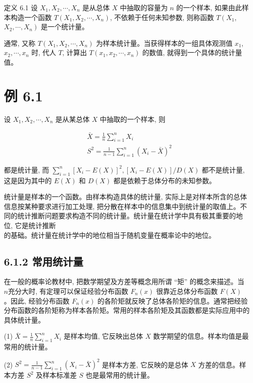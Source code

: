 \documentclass[10pt]{article}
\begin{document}
\begin{CJK*}{UTF8}{bsmi}
定义 6.1 设 $X_{1}, X_{2}, \cdots, X_{n}$ 是从总体 $X$ 中抽取的容量为 $n$ 的一个样本, 如果由此样本构造一个函数 $T\left(X_{1}, X_{2}, \cdots, X_{n}\right)$, 不依赖于任何未知参数, 则称函数 $T\left(X_{1}\right.$, $\left.X_{2}, \cdots, X_{n}\right)$ 是一个统计量。

通常, 又称 $T\left(X_{1}, X_{2}, \cdots, X_{n}\right)$ 为样本统计量。当获得样本的一组具体观测值 $x_{1}$, $x_{2}, \cdots, x_{n}$ 时, 代人 $T$, 计算出 $T\left(x_{1}, x_{2}, \cdots, x_{n}\right)$ 的数值, 就得到一个具体的统计量值。

\section*{例 6.1}
设 $X_{1}, X_{2}, \cdots, X_{n}$ 是从某总体 $X$ 中抽取的一个样本, 则

$$
\begin{aligned}
& \bar{X}=\frac{1}{n} \sum_{i=1}^{n} X_{i} \\
& S^{2}=\frac{1}{n-1} \sum_{i=1}^{n}\left(X_{i}-\bar{X}\right)^{2}
\end{aligned}
$$

都是统计量, 而 $\sum_{i=1}^{n}\left[X_{i}-E(X)\right]^{2},\left[X_{i}-E(X)\right] / D(X)$ 都不是统计量, 这是因为其中的 $E(X)$ 和 $D(X)$ 都是依赖于总体分布的未知参数。

统计量是样本的一个函数。由样本构造具体的统计量, 实际上是对样本所含的总体信息按某种要求进行加工处理, 把分散在样本中的信息集中到统计量的取值上。不同的统计推断问题要求构造不同的统计量。统计量在统计学中具有极其重要的地位, 它是统计推断\\
的基础。统计量在统计学中的地位相当于随机变量在概率论中的地位。

\subsection*{6.1.2 常用统计量}
在一般的概率论教材中, 把数学期望及方差等概念用所谓 “矩” 的概念来描述。当 $n$充分大时, 有定理可以保证经验分布函数 $F_{n}(x)$ 很靠近总体分布函数 $F(X)$ 。因此, 经验分布函数 $F_{n}(x)$ 的各阶矩就反映了总体各阶矩的信息。通常把经验分布函数的各阶矩称为样本各阶矩。常用的样本各阶矩及其函数都是实际应用中的具体统计量。

(1) $\bar{X}=\frac{1}{n} \sum_{i=1}^{n} X_{i}$ 是样本均值, 它反映出总体 $X$ 数学期望的信息。样本均值是最常用的统计量。

(2) $S^{2}=\frac{1}{n-1} \sum_{i=1}^{n}\left(X_{i}-\bar{X}\right)^{2}$ 是样本方差, 它反映的是总体 $X$ 方差的信息。样本方差 $S^{2}$ 及样本标准差 $S$ 也是最常用的统计量。


\end{CJK*}
\end{document}
